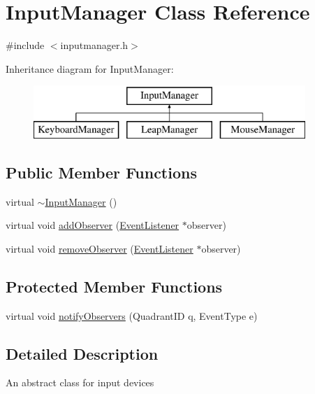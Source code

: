 \hypertarget{class_input_manager}{\section{Input\+Manager Class Reference}
\label{class_input_manager}
}


{\ttfamily \#include $<$inputmanager.\+h$>$}

Inheritance diagram for Input\+Manager\+:\begin{figure}[H]
\begin{center}
\leavevmode
\includegraphics[height=2.000000cm]{class_input_manager}
\end{center}
\end{figure}
\subsection*{Public Member Functions}
\begin{DoxyCompactItemize}
\item 
virtual \hyperlink{class_input_manager_adf6f0d9103512c1bd7d89c54ddd299fe}{$\sim$\+Input\+Manager} ()
\item 
virtual void \hyperlink{class_input_manager_a9e689d7906407b5c0de0d384d457dbd6}{add\+Observer} (\hyperlink{class_event_listener}{Event\+Listener} $\ast$observer)
\item 
virtual void \hyperlink{class_input_manager_a35582c7c194fb8af1c649556e4935d08}{remove\+Observer} (\hyperlink{class_event_listener}{Event\+Listener} $\ast$observer)
\end{DoxyCompactItemize}
\subsection*{Protected Member Functions}
\begin{DoxyCompactItemize}
\item 
virtual void \hyperlink{class_input_manager_a4040fa67ecc810c5da6110ecf42b8bc7}{notify\+Observers} (Quadrant\+I\+D q, Event\+Type e)
\end{DoxyCompactItemize}


\subsection{Detailed Description}
An abstract class for input devices 

